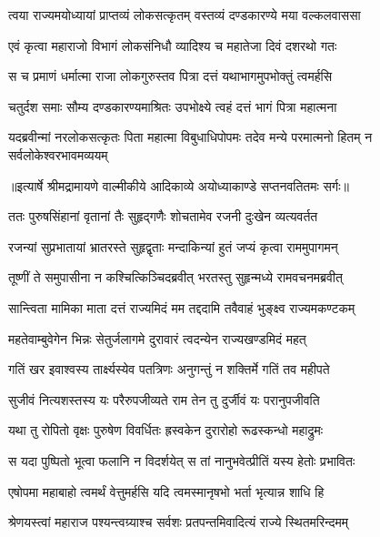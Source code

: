 \twolineshloka
{त्वया राज्यमयोध्यायां प्राप्तव्यं लोकसत्कृतम्}
{वस्तव्यं दण्डकारण्ये मया वल्कलवाससा} %

\twolineshloka
{एवं कृत्वा महाराजो विभागं लोकसंनिधौ}
{व्यादिश्य च महातेजा दिवं दशरथो गतः} %

\twolineshloka
{स च प्रमाणं धर्मात्मा राजा लोकगुरुस्तव}
{पित्रा दत्तं यथाभागमुपभोक्तुं त्वमर्हसि} %

\twolineshloka
{चतुर्दश समाः सौम्य दण्डकारण्यमाश्रितः}
{उपभोक्ष्ये त्वहं दत्तं भागं पित्रा महात्मना} %

\fourlineindentedshloka
{यदब्रवीन्मां नरलोकसत्कृतः}
{पिता महात्मा विबुधाधिपोपमः}
{तदेव मन्ये परमात्मनो हितम्}
{न सर्वलोकेश्वरभावमव्ययम्} %


{॥इत्यार्षे श्रीमद्रामायणे वाल्मीकीये आदिकाव्ये अयोध्याकाण्डे सप्तनवतितमः सर्गः॥}


\twolineshloka
{ततः पुरुषसिंहानां वृतानां तैः सुहृद्गणैः}
{शोचतामेव रजनी दुःखेन व्यत्यवर्तत} %

\twolineshloka
{रजन्यां सुप्रभातायां भ्रातरस्ते सुहृद्वृताः}
{मन्दाकिन्यां हुतं जप्यं कृत्वा राममुपागमन्} %

\twolineshloka
{तूष्णीं ते समुपासीना न कश्चित्किञ्चिदब्रवीत्}
{भरतस्तु सुहृन्मध्ये रामवचनमब्रवीत्} %

\twolineshloka
{सान्त्विता मामिका माता दत्तं राज्यमिदं मम}
{तद्ददामि तवैवाहं भुङ्क्ष्व राज्यमकण्टकम्} %

\twolineshloka
{महतेवाम्बुवेगेन भिन्नः सेतुर्जलागमे}
{दुरावारं त्वदन्येन राज्यखण्डमिदं महत्} %

\twolineshloka
{गतिं खर इवाश्वस्य तार्क्ष्यस्येव पतत्रिणः}
{अनुगन्तुं न शक्तिर्मे गतिं तव महीपते} %

\twolineshloka
{सुजीवं नित्यशस्तस्य यः परैरुपजीव्यते}
{राम तेन तु दुर्जीवं यः परानुपजीवति} %

\twolineshloka
{यथा तु रोपितो वृक्षः पुरुषेण विवर्धितः}
{ह्रस्वकेन दुरारोहो रूढस्कन्धो महाद्रुमः} %

\twolineshloka
{स यदा पुष्पितो भूत्वा फलानि न विदर्शयेत्}
{स तां नानुभवेत्प्रीतिं यस्य हेतोः प्रभावितः} %

\twolineshloka
{एषोपमा महाबाहो त्वमर्थं वेत्तुमर्हसि}
{यदि त्वमस्मानृषभो भर्ता भृत्यान्न शाधि हि} %

\twolineshloka
{श्रेणयस्त्वां महाराज पश्यन्त्वग्र्याश्च सर्वशः}
{प्रतपन्तमिवादित्यं राज्ये स्थितमरिन्दमम्} %

